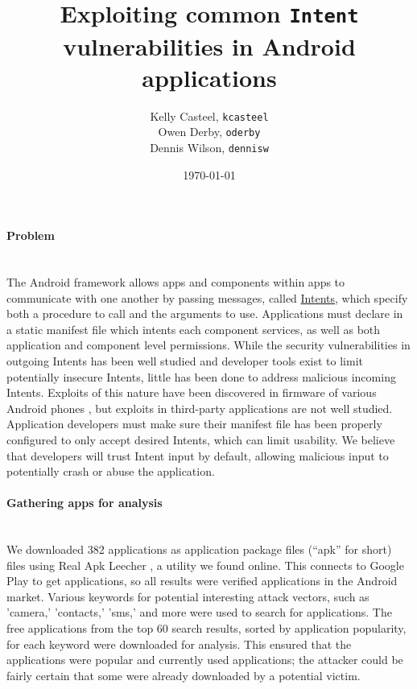 \documentclass[12pt,a4paper]{article}
\title{Exploiting common \texttt{Intent} vulnerabilities in Android %
applications}
\date{\today}
\author{Kelly Casteel, \texttt{kcasteel}\\ Owen Derby, \texttt{oderby}\\ Dennis Wilson,
\texttt{dennisw}}
\begin{document}
 

\maketitle

\paragraph{Problem} ~\\

The Android framework allows apps and components within apps to communicate with
one another by passing messages, called
\href{https://developer.android.com/reference/android/content/Intent.html}{Intents},
which specify both a procedure to call and the arguments to use. Applications
must declare in a static manifest file which intents each component services, as
well as both application and component level permissions. While the security
vulnerabilities in outgoing Intents has been well studied
\cite{chin_analyzing_2011} and developer tools exist to limit potentially
insecure Intents, little has been done to address malicious incoming Intents.
Exploits of this nature have been discovered in firmware of various Android
phones \cite{grace_systematic_2012}, but exploits in third-party applications
are not well studied. Application developers must make sure their manifest file
has been properly configured to only accept desired Intents, which can limit
usability. We believe that developers will trust Intent input by default,
allowing malicious input to potentially crash or abuse the application.

\paragraph{Gathering apps for analysis} ~\\

We downloaded 382 applications as application package files (``apk'' for short)
files using Real Apk Leecher \cite{apkleecher}, a utility we found online. This
connects to Google Play to get applications, so all results were verified
applications in the Android market. Various keywords for potential interesting
attack vectors, such as 'camera,' 'contacts,' 'sms,' and more were used to
search for applications. The free applications from the top 60 search results,
sorted by application popularity, for each keyword were downloaded for analysis.
This ensured that the applications were popular and currently used applications;
the attacker could be fairly certain that some were already downloaded by a
potential victim.
\end{document}

